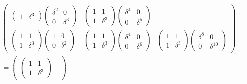 \begin{multline*}
\begin{pmatrix}
\begin{pmatrix}
            1 & \delta^3
        \end{pmatrix}
        \begin{pmatrix}
            \delta^2 & 0        \\
            0        & \delta^3
        \end{pmatrix}
        &
        \begin{pmatrix}
            1 & 1        \\
            1 & \delta^3
        \end{pmatrix}
        \begin{pmatrix}
            \delta^4 & 0        \\
            0        & \delta^5
        \end{pmatrix}
        \\
        \begin{pmatrix}
            1 & 1        \\
            1 & \delta^3
        \end{pmatrix}
        \begin{pmatrix}
            1 & 0        \\
            0 & \delta^2
        \end{pmatrix}
        &
        \begin{pmatrix}
            1 & 1        \\
            1 & \delta^3
        \end{pmatrix}
        \begin{pmatrix}
            \delta^4 & 0        \\
            0        & \delta^6
        \end{pmatrix}
        &
        \begin{pmatrix}
            1 & 1        \\
            1 & \delta^3
        \end{pmatrix}
        \begin{pmatrix}
            \delta^8 & 0           \\
            0        & \delta^{10}
        \end{pmatrix}
    \end{pmatrix} = \\
    =
    \begin{pmatrix}
        \begin{pmatrix}
            1 & 1        \\
            1 & \delta^3
        \end{pmatrix}
        &

\end{pmatrix}
\end{multline*}
